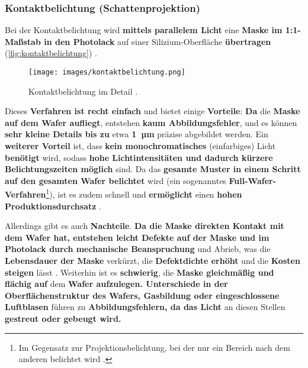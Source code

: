 \documentclass{article} %
\begin{document}


\vspace{1em}

\subsubsection{Kontaktbelichtung (Schattenprojektion)}

\vspace{1em}

Bei der Kontaktbelichtung wird \textbf{mittels parallelem Licht} eine \textbf{Maske im 1:1-Maßstab in den Photolack} auf einer Silizium-Oberfläche \textbf{übertragen} (\autoref{fig:kontaktbelichtung}) \cite{Mescheder2004}.

\begin{figure}[htb!]
    \centering
    \texttt{[image: images/kontaktbelichtung.png]} %
    \captionsetup{labelfont=bf, width=\textwidth} %
    \caption{Kontaktbelichtung im Detail \cite{schmid2024}.}
    \label{fig:kontaktbelichtung}
\end{figure}

\vspace{1em}

Dieses \textbf{Verfahren ist recht einfach} und bietet einige \textbf{Vorteile}: \textbf{Da} die \textbf{Maske auf dem Wafer aufliegt}, entstehen \textbf{kaum Abbildungsfehler}, und es können \textbf{sehr kleine Details bis zu} etwa \textbf{1~µm} präzise abgebildet werden. Ein \textbf{weiterer Vorteil} ist, dass \textbf{kein monochromatisches} (einfarbiges) Licht \textbf{benötigt} wird, sodass \textbf{hohe Lichtintensitäten und dadurch kürzere Belichtungszeiten möglich} sind. Da das \textbf{gesamte Muster in einem Schritt auf den gesamten Wafer belichtet} wird (ein sogenanntes \textbf{Full-Wafer-Verfahren}\footnote{Im Gegensatz zur Projektionsbelichtung, bei der nur ein Bereich nach dem anderen belichtet wird \cite{Mescheder2004}.}), ist es zudem schnell und \textbf{ermöglicht} einen \textbf{hohen Produktionsdurchsatz} \cite{schmid2024}.

\vspace{1em}

Allerdings gibt es auch \textbf{Nachteile}. \textbf{Da die Maske direkten Kontakt mit dem Wafer hat, entstehen leicht Defekte auf der Maske und im Photolack durch mechanische Beanspruchung} und Abrieb, was die \textbf{Lebensdauer der Maske} verkürzt, die \textbf{Defektdichte erhöht} und die \textbf{Kosten steigen} lässt \cite{schmid2024}. Weiterhin ist es \textbf{schwierig}, die \textbf{Maske gleichmäßig und flächig auf} dem \textbf{Wafer aufzulegen. Unterschiede in der Oberflächenstruktur des Wafers, Gasbildung oder eingeschlossene Luftblasen} führen zu \textbf{Abbildungsfehlern, da das Licht} an diesen Stellen \textbf{gestreut oder gebeugt wird.}
\end{document}
